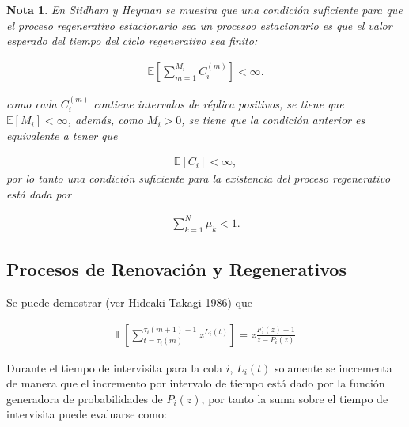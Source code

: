 \documentclass{article}
\newtheorem{Note}{Nota}
\newcommand{\esp}{\mathbb{E}}
\begin{document}
\begin{Note}\label{Cita1.Stidham}
En Stidham\cite{Stidham} y Heyman  se muestra que una condici\'on suficiente para que el proceso regenerativo 
estacionario sea un procesoo estacionario es que el valor esperado del tiempo del ciclo regenerativo sea finito:

\begin{eqnarray*}
\esp\left[\sum_{m=1}^{M_{i}}C_{i}^{(m)}\right]<\infty.
\end{eqnarray*}

como cada $C_{i}^{(m)}$ contiene intervalos de r\'eplica positivos, se tiene que $\esp\left[M_{i}\right]<\infty$, adem\'as, como $M_{i}>0$, se tiene que la condici\'on anterior es equivalente a tener que 

\begin{eqnarray*}
\esp\left[C_{i}\right]<\infty,
\end{eqnarray*}
por lo tanto una condici\'on suficiente para la existencia del proceso regenerativo est\'a dada por

\begin{eqnarray*}
\sum_{k=1}^{N}\mu_{k}<1.
\end{eqnarray*}

{}
\end{Note}

\subsection{Procesos de Renovaci\'on y Regenerativos}



Se puede demostrar (ver Hideaki Takagi 1986) que

\begin{eqnarray*}
\esp\left[\sum_{t=\tau_{i}\left(m\right)}^{\tau_{i}\left(m+1\right)-1}z^{L_{i}\left(t\right)}\right]=z\frac{F_{i}\left(z\right)-1}{z-P_{i}\left(z\right)}
\end{eqnarray*}

Durante el tiempo de intervisita para la cola $i$, $L_{i}\left(t\right)$ solamente se incrementa de manera que el incremento por intervalo de tiempo est\'a dado por la funci\'on generadora de probabilidades de $P_{i}\left(z\right)$, por tanto la suma sobre el tiempo de intervisita puede evaluarse como:
\end{document}
